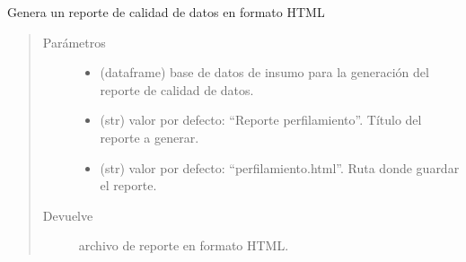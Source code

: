 \documentclass[letterpaper,10pt,openany,spanish]{sphinxmanual}
\begin{document}
\label{\detokenize{reporte:module-reporte}}

\begin{fulllineitems}
\label{\detokenize{reporte:reporte.generar_reporte}}
Genera un reporte de calidad de datos en formato HTML
\begin{quote}\begin{description}
\item[{Parámetros}] \leavevmode\begin{itemize}
\item {} 
 \textendash{} (dataframe) base de datos de insumo para la generación del reporte de calidad de datos.

\item {} 
 \textendash{} (str) valor por defecto: “Reporte perfilamiento”. Título del reporte a generar.

\item {} 
 \textendash{} (str) valor por defecto: “perfilamiento.html”. Ruta donde guardar el reporte.

\end{itemize}

\item[{Devuelve}] \leavevmode
archivo de reporte en formato HTML.

\end{description}\end{quote}

\end{fulllineitems}
\end{document}
